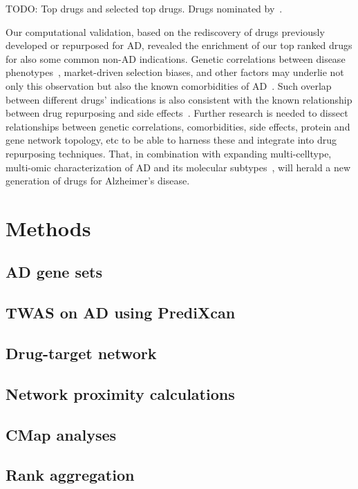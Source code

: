 \documentclass[letterpaper]{article}
\begin{document}
TODO: Top drugs and selected top drugs.  Drugs nominated
by~\cite{Fang2021,Taubes2021}.

Our computational validation, based on the rediscovery of drugs previously
developed or repurposed for AD, revealed the enrichment of our top ranked
drugs for also some common non-AD indications.  Genetic correlations between
disease phenotypes~\citep{Consortium2018}, market-driven selection biases, and
other factors may underlie not only this observation but also the known
comorbidities of AD~\citep{Santiago2021}.  Such overlap between different
drugs' indications is also consistent with the known relationship between drug
repurposing and side effects~\citep{Ye2014}.  Further research is needed to
dissect relationships between genetic correlations, comorbidities, side
effects, protein and gene network topology, etc to be able to harness these and
integrate into drug repurposing techniques.  That, in combination with
expanding multi-celltype, multi-omic characterization of AD and its molecular
subtypes~\citep{Neff2021}, will herald a new generation of drugs for
Alzheimer's disease.

\section{Methods}

\subsection{AD gene sets}

\subsection{TWAS on AD using PrediXcan}

\subsection{Drug-target network}

\subsection{Network proximity calculations}

\subsection{CMap analyses}

\subsection{Rank aggregation}
\end{document}
